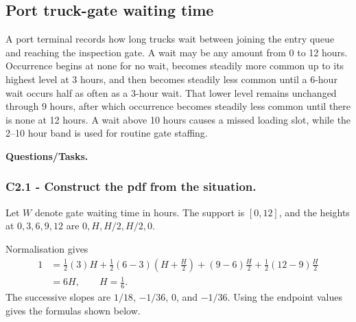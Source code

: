 \subsection{Port truck-gate waiting time}\label{sec:c2-piecewise-linear-gate}
A port terminal records how long trucks wait between joining the entry queue
and reaching the inspection gate.  A wait may be any amount from 0 to 12
hours.  Occurrence begins at none for no wait, becomes steadily more
common up to its highest level at 3 hours, and then becomes steadily less common
until a 6-hour wait occurs half as often as a 3-hour wait.  That lower level
remains unchanged through 9 hours, after which occurrence becomes steadily less
common until there is none at 12 hours.  A wait above 10 hours causes
a missed loading slot, while the 2--10 hour band is used for routine gate
staffing.

\begingroup{}
\endgroup

\textbf{Questions/Tasks.}
\begin{enumerate}
\end{enumerate}

\subsubsection*{C2.1 - Construct the pdf from the situation.}
\label{subsec:c2-piecewise-linear-gate-a}
Let $W$ denote gate waiting time in hours.  The support is $[0,12]$, and the
heights at $0,3,6,9,12$ are $0,H,H/2,H/2,0$.

Normalisation gives
\[
 \begin{aligned}
 1&=\frac12(3)H
 +\frac12(6-3)\left(H+\frac H2\right)
 +(9-6)\frac H2+\frac12(12-9)\frac H2\\
 &=6H,\qquad H=\frac16.
 \end{aligned}
\]
The successive slopes are $1/18$, $-1/36$, $0$, and $-1/36$.
Using the endpoint values gives the formulas shown below.

